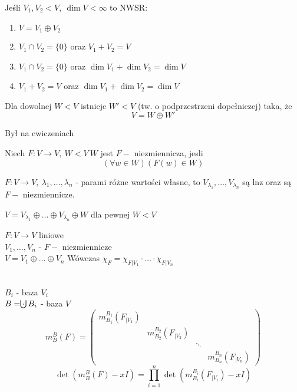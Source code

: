 \begin{wn} 
    Jeśli $V_1,V_2 < V, \ \dim V < \infty$ to NWSR:
    \begin{enumerate}[(1)]
        \item $V = V_1 \oplus V_2$
        \item $V_1 \cap V_2 = \{ 0\}$ oraz $V_1 + V_2 = V$
        \item $V_1 \cap V_2 = \{ 0\}$ oraz $\dim V_1 + \dim V_2 = \dim V$ 
        \item $V_1 + V_2 = V$ oraz $\dim V_1 + \dim V_2 = \dim V$
    \end{enumerate} 
\end{wn}
\begin{lem} 
    Dla dowolnej $W < V$ istnieje $W' < V$ (tw. o podprzestrzeni dopełniczej) taka, że \[V = W \oplus W'\]
    \begin{dd} Był na cwiczeniach \end{dd} 
\end{lem} 
\begin{df} 
    Niech $F: V \to V,\ W < V \ W$ jest $F-$ niezmiennicza, jesli \[ (\forall w \in W) (F(w) \in W)\]
\end{df}
\begin{ft} 
    $F: V \to V,\ \lambda_1,\ldots,\lambda_n$ - parami różne wartości własne, to $V_{\lambda_1},\ldots,
    V_{\lambda_n}$ są lnz oraz są $F-$ niezmiennicze.
\end{ft} 
\begin{wn} 
    $V = V_{\lambda_1} \oplus \ldots \oplus V_{\lambda_n} \oplus W$ dla pewnej $W < V$
\end{wn} 
\begin{ft} 
    $F: V \to V$ liniowe \\ 
    $V_1,\ldots,V_n$ - $F-$ niezmiennicze \\ 
    $V = V_1 \oplus \ldots \oplus V_n$ 
    Wówczas $\chi_F = \chi_{F|{V_1}} \cdot \ldots \cdot \chi_{F|V_n}$
\end{ft} 
\begin{dd} ~\\ 
    $B_i$ - baza $V_i$ \\ 
    $B = \cdot \hspace{-7.5pt}\bigcup B_i$ - baza $V$
    \[ m_B^B (F) = 
        \begin{pmatrix} 
            m_{B_1}^{B_1} (F_{|V_1}) & & &  \\ 
                                     &  m_{B_2}^{B_2} (F_{|V_2}) & & \\ 
                                     & & \ddots & \\ 
                                     & & &   m_{B_n}^{B_n} (F_{|V_n}) 
        \end{pmatrix} 
    \]
    \[ \det (m_B^B (F) - xI) = \prod_{i=1}^n \det (m_{B_i}^{B_i} (F_{|V_i}) -xI)\]
\end{dd} 
